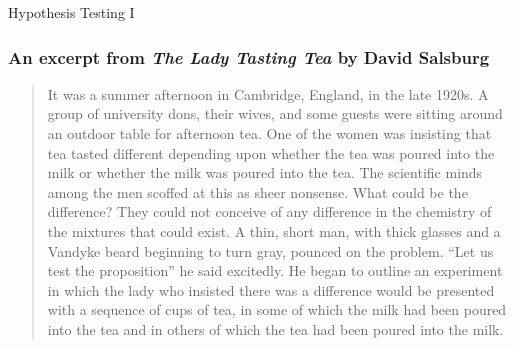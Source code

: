 \documentclass[handout]{beamer}
\date{Lecture 19}
\begin{document}
 





\begin{frame}[plain]
	\titlepage 
	

\end{frame} 



\begin{frame}
\begin{center}
\Huge Hypothesis Testing I
\end{center}
\end{frame}

\begin{frame}
\frametitle{An excerpt from \emph{The Lady Tasting Tea} by David Salsburg}
\footnotesize
\begin{quote}
It was a summer afternoon in Cambridge, England, in the late 1920s. A group of university dons, their wives, and some guests were sitting around an outdoor table for afternoon tea. One of the women was insisting that tea tasted different depending upon whether the tea was poured into the milk or whether the milk was poured into the tea. The scientific minds among the men scoffed at this as sheer nonsense. What could be the difference? They could not conceive of any difference in the chemistry of the mixtures that could exist. A thin, short man, with thick glasses and a Vandyke beard beginning to turn gray, pounced on the problem. ``Let us test the proposition'' he said excitedly. He began to outline an experiment in which the lady who insisted there was a difference would be presented with a sequence of cups of tea, in some of which the milk had been poured into the tea and in others of which the tea had been poured into the milk.
\end{quote}
\end{frame}




\end{document}

